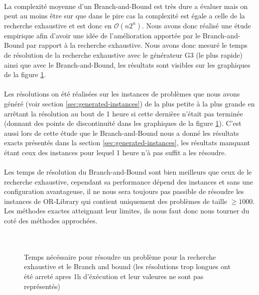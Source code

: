 \documentclass[12pt,letterpaper,twoside]{article}
\begin{document}
			\paragraph*{}
				La complexité moyenne d'un Branch-and-Bound est très dure a évaluer mais on peut au moins être sur que dans le pire cas la complexité est égale a celle de la recherche exhaustive et est donc en \(\mathcal{O}(n2^n)\). Nous avons donc réalisé une étude empirique afin d'avoir une idée de l'amélioration apportée par le Branch-and-Bound par rapport à la recherche exhaustive. Nous avons donc mesuré le temps de résolution de la recherche exhaustive avec le générateur G3 (le plus rapide) ainsi que avec le Branch-and-Bound, les résultats sont visibles sur les graphiques de la figure \ref{figure:plots/exhaustive_bnb_time}.
			\paragraph*{}
				Les résolutions on été réalisées sur les instances de problèmes que nous avons généré (voir section \ref{sec:generated-instances}) de la plus petite à la plus grande en arrêtant la résolution au bout de 1 heure si cette dernière n'était pas terminée (donnant des points de discontinuité dans les graphiques de la figure \ref{figure:plots/exhaustive_bnb_time}). C'est aussi lors de cette étude que le Branch-and-Bound nous a donné les résultats exacts présentés dans la section \ref{sec:generated-instances}, les résultats manquant étant ceux des instances pour lequel 1 heure n'à pas suffit a les résoudre.
			\paragraph*{}
				Les temps de résolution du Branch-and-Bound sont bien meilleurs que ceux de le recherche exhaustive, cependant sa performance dépend des instances et sans une configuration avantageuse, il ne nous sera toujours pas passible de résoudre les instances de OR-Library qui contient uniquement des problèmes de taille \(\ge 1000\). Les méthodes exactes atteignant leur limites, ils nous faut donc nous tourner du coté des méthodes approchées.
			\paragraph*{}
				\hfill{}
			\begin{figure}[H]
				\centering
				\\
				\caption{Temps nécéssaire pour résoudre un problème pour la recherche exhaustive et le Branch and bound (les résolutions trop longues ont été arreté apres 1h d'éxécution et leur valeures ne sont pas représentés)}
				\label{figure:plots/exhaustive_bnb_time}
			\end{figure}
\end{document}
